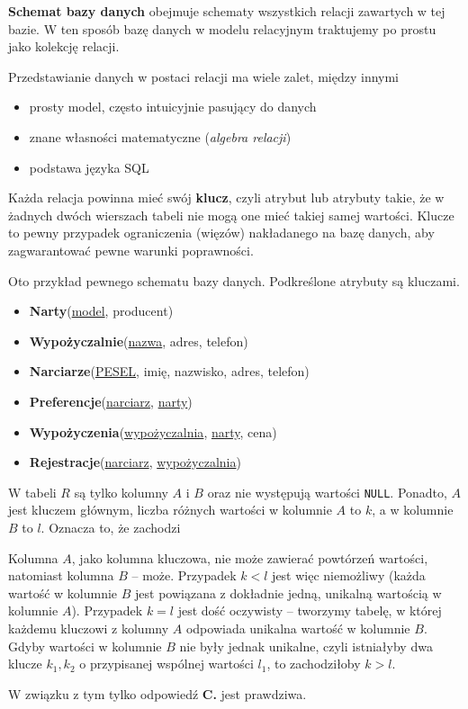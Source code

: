 \textbf{Schemat bazy danych} obejmuje schematy wszystkich relacji zawartych w tej bazie. W ten sposób bazę danych w modelu relacyjnym traktujemy po prostu jako kolekcję relacji.

Przedstawianie danych w postaci relacji ma wiele zalet, między innymi
\begin{itemize}
    \item prosty model, często intuicyjnie pasujący do danych
    \item znane własności matematyczne (\textit{algebra relacji})
    \item podstawa języka SQL
\end{itemize}

Każda relacja powinna mieć swój \textbf{klucz}, czyli atrybut lub atrybuty takie, że w żadnych dwóch wierszach tabeli nie mogą one mieć takiej samej wartości. Klucze to pewny przypadek ograniczenia (więzów) nakładanego na bazę danych, aby zagwarantować pewne warunki poprawności.

\begin{example}
    Oto przykład pewnego schematu bazy danych. Podkreślone atrybuty są kluczami.
    \begin{itemize}
        \item \textbf{Narty}(\underline{model}, producent)
        \item \textbf{Wypożyczalnie}(\underline{nazwa}, adres, telefon)
        \item \textbf{Narciarze}(\underline{PESEL}, imię, nazwisko, adres, telefon)
        \item \textbf{Preferencje}(\underline{narciarz}, \underline{narty})
        \item \textbf{Wypożyczenia}(\underline{wypożyczalnia}, \underline{narty}, cena)
        \item \textbf{Rejestracje}(\underline{narciarz}, \underline{wypożyczalnia})
    \end{itemize}
\end{example}

\begin{exam}
    W tabeli $R$ są tylko kolumny $A$ i $B$ oraz nie występują wartości \texttt{NULL}. Ponadto, $A$ jest kluczem głównym, liczba różnych wartości w kolumnie $A$ to $k$, a w kolumnie $B$ to $l$. Oznacza to, że zachodzi
    \bigskip

    Kolumna $A$, jako kolumna kluczowa, nie może zawierać powtórzeń wartości, natomiast kolumna $B$ -- może. Przypadek $k < l$ jest więc niemożliwy (każda wartość w kolumnie $B$ jest powiązana z dokładnie jedną, unikalną wartością w kolumnie $A$). Przypadek $k = l$ jest dość oczywisty -- tworzymy tabelę, w której każdemu kluczowi z kolumny $A$ odpowiada unikalna wartość w kolumnie $B$. Gdyby wartości w kolumnie $B$ nie były jednak unikalne, czyli istniałyby dwa klucze $k_1, k_2$ o przypisanej wspólnej wartości $l_1$, to zachodziłoby $k > l$.

    W związku z tym tylko odpowiedź \textbf{C.} jest prawdziwa.
\end{exam}

